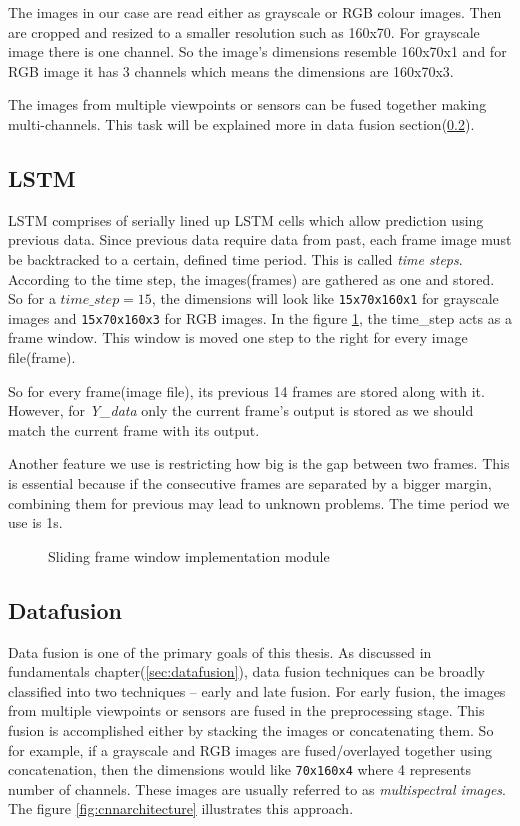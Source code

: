 The images in our case are read either as grayscale or RGB colour images. Then are cropped
and resized to a smaller resolution such as 160x70. For grayscale image there is one
channel. So the image's dimensions resemble 160x70x1 and for RGB image it has 3 channels
which means the dimensions are 160x70x3.

The images from multiple viewpoints or sensors can be fused together making
multi-channels. This task will be explained more in data fusion
section(\ref{chap05Implsubsec:datafusion1}).

\subsection{LSTM}

LSTM comprises of serially lined up LSTM cells which allow prediction using previous
data. Since previous data require data from past, each frame image must be backtracked to
a certain, defined time period. This is called \textit{time steps}. According to the time
step, the images(frames) are gathered as one and stored. So for a $time\_step = 15$, the
dimensions will look like \texttt{15x70x160x1} for grayscale images and \texttt{15x70x160x3} for RGB
images. In the figure \ref{fig:slidingwindow}, the time\_step acts as a frame window. This
window is moved one step to the right for every image file(frame).

So for every frame(image file), its previous 14 frames are stored along with it. However,
for \textit{Y\_{data}} only the current frame's output is stored as we should match the
current frame with its output.

Another feature we use is restricting how big is the gap between two frames. This is
essential because if the consecutive frames are separated by a bigger margin, combining
them for previous may lead to unknown problems. The time period we use is 1s.
\begin{figure}[h]
	\centering
    \def\svgwidth{0.8\textwidth}
    \caption{Sliding frame window implementation module}
    \label{fig:slidingwindow}
\end{figure}

\subsection{Datafusion}
\label{chap05Implsubsec:datafusion1}
Data fusion is one of the primary goals of this thesis. As discussed in fundamentals
chapter(\ref{sec:datafusion}), data fusion techniques can be broadly classified  into two techniques -- early and late
fusion. For early fusion, the images from multiple viewpoints or sensors are fused in the
preprocessing stage. This fusion is accomplished either by stacking the images or
concatenating them. So for example, if a grayscale and RGB images are fused/overlayed together using
concatenation, then the dimensions would like \texttt{70x160x4} where 4 represents number
of channels. These images are usually referred to as \textit{multispectral images}. The figure \ref{fig:cnnarchitecture} illustrates this approach.

